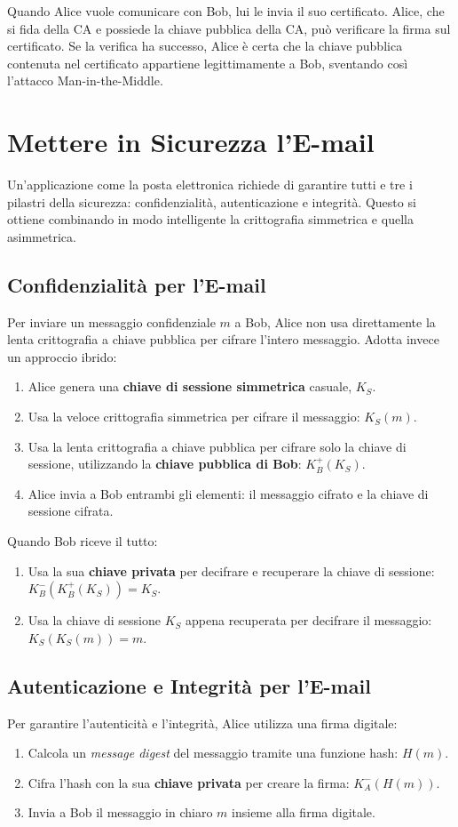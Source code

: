 Quando Alice vuole comunicare con Bob, lui le invia il suo certificato. Alice, che si fida della CA e possiede la chiave pubblica della CA, può verificare la firma sul certificato. Se la verifica ha successo, Alice è certa che la chiave pubblica contenuta nel certificato appartiene legittimamente a Bob, sventando così l'attacco Man-in-the-Middle.

\section{Mettere in Sicurezza l'E-mail}
Un'applicazione come la posta elettronica richiede di garantire tutti e tre i pilastri della sicurezza: confidenzialità, autenticazione e integrità. Questo si ottiene combinando in modo intelligente la crittografia simmetrica e quella asimmetrica.

\subsection{Confidenzialità per l'E-mail}
Per inviare un messaggio confidenziale $m$ a Bob, Alice non usa direttamente la lenta crittografia a chiave pubblica per cifrare l'intero messaggio. Adotta invece un approccio ibrido:
\begin{enumerate}
    \item Alice genera una \textbf{chiave di sessione simmetrica} casuale, $K_S$.
    \item Usa la veloce crittografia simmetrica per cifrare il messaggio: $K_S(m)$.
    \item Usa la lenta crittografia a chiave pubblica per cifrare solo la chiave di sessione, utilizzando la \textbf{chiave pubblica di Bob}: $K_B^+(K_S)$.
    \item Alice invia a Bob entrambi gli elementi: il messaggio cifrato e la chiave di sessione cifrata.
\end{enumerate}

Quando Bob riceve il tutto:
\begin{enumerate}
    \item Usa la sua \textbf{chiave privata} per decifrare e recuperare la chiave di sessione: $K_B^-(K_B^+(K_S)) = K_S$.
    \item Usa la chiave di sessione $K_S$ appena recuperata per decifrare il messaggio: $K_S(K_S(m)) = m$.
\end{enumerate}

\subsection{Autenticazione e Integrità per l'E-mail}
Per garantire l'autenticità e l'integrità, Alice utilizza una firma digitale:
\begin{enumerate}
    \item Calcola un \textit{message digest} del messaggio tramite una funzione hash: $H(m)$.
    \item Cifra l'hash con la sua \textbf{chiave privata} per creare la firma: $K_A^-(H(m))$.
    \item Invia a Bob il messaggio in chiaro $m$ insieme alla firma digitale.
\end{enumerate}

